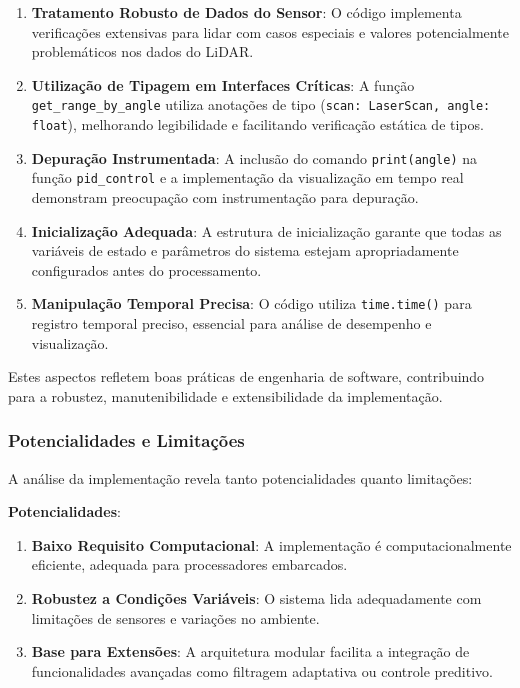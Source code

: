 \begin{enumerate}
    \item \textbf{Tratamento Robusto de Dados do Sensor}: O código implementa verificações extensivas para lidar com casos especiais e valores potencialmente problemáticos nos dados do LiDAR.

    \item \textbf{Utilização de Tipagem em Interfaces Críticas}: A função \texttt{get\_range\_by\_angle} utiliza anotações de tipo (\texttt{scan: LaserScan, angle: float}), melhorando legibilidade e facilitando verificação estática de tipos.

    \item \textbf{Depuração Instrumentada}: A inclusão do comando \texttt{print(angle)} na função \texttt{pid\_control} e a implementação da visualização em tempo real demonstram preocupação com instrumentação para depuração.

    \item \textbf{Inicialização Adequada}: A estrutura de inicialização garante que todas as variáveis de estado e parâmetros do sistema estejam apropriadamente configurados antes do processamento.

    \item \textbf{Manipulação Temporal Precisa}: O código utiliza \texttt{time.time()} para registro temporal preciso, essencial para análise de desempenho e visualização.
\end{enumerate}

Estes aspectos refletem boas práticas de engenharia de software, contribuindo
para a robustez, manutenibilidade e extensibilidade da implementação.

\subsubsection{Potencialidades e Limitações}

A análise da implementação revela tanto potencialidades quanto limitações:

\textbf{Potencialidades}:

\begin{enumerate}
    \item \textbf{Baixo Requisito Computacional}: A implementação é computacionalmente eficiente, adequada para processadores embarcados.

    \item \textbf{Robustez a Condições Variáveis}: O sistema lida adequadamente com limitações de sensores e variações no ambiente.

    \item \textbf{Base para Extensões}: A arquitetura modular facilita a integração de funcionalidades avançadas como filtragem adaptativa ou controle preditivo.
\end{enumerate}

